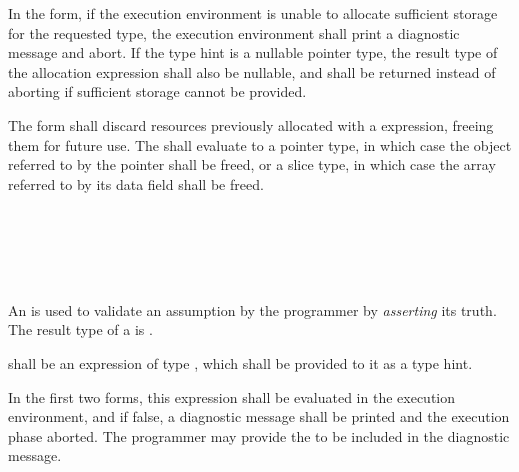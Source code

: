 

\specsubsubitem
In the  form, if the execution environment is unable to
allocate sufficient storage for the requested type, the execution environment
shall print a diagnostic message and abort. If the type hint is a nullable
pointer type, the result type of the allocation expression shall also be
nullable, and  shall be returned instead of aborting if
sufficient storage cannot be provided.

\specsubsubitem
The  form shall discard resources previously allocated with a
 expression, freeing them for future use. The
 shall evaluate to a pointer type, in which case the
object referred to by the pointer shall be freed, or a slice type, in which
case the array referred to by its data field shall be freed.


\begin{grammar}
 \\
	  \terminal{(}  \terminal{)} \\
	  \terminal{(}  \terminal{,}  \terminal{)} \\
	  \terminal{(}  \terminal{)} \\
\end{grammar}

\specsubsubitem
An  is used to validate an assumption by the
programmer by \textit{asserting} its truth. The result type of a
 is .

\specsubsubitem
{} shall be an expression of type , which
shall be provided to it as a type hint.

\specsubsubitem
In the first two forms, this expression shall be evaluated
in the execution environment, and if false, a diagnostic message shall be
printed and the execution phase aborted. The programmer may provide the
 to be included in the diagnostic message.

